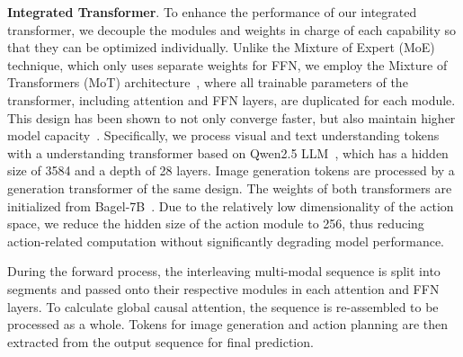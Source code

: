 \textbf{Integrated Transformer}.
To enhance the performance of our integrated transformer, we decouple the modules and weights in charge of each capability so that they can be optimized individually. 
Unlike the Mixture of Expert (MoE) technique, which only uses separate weights for FFN, we employ the Mixture of Transformers (MoT) architecture~\cite{MoT, llamafusion}, where all trainable parameters of the transformer, including attention and FFN layers, are duplicated for each module. 
This design has been shown to not only converge faster, but also maintain higher model capacity~\cite{bagel}. 
Specifically, we process visual and text understanding tokens with a understanding transformer based on Qwen2.5 LLM~\cite{qwen2_5}, which has a hidden size of 3584 and a depth of 28 layers. 
Image generation tokens are processed by a generation transformer of the same design. The weights of both transformers are initialized from Bagel-7B~\cite{bagel}. 
Due to the relatively low dimensionality of the action space, we reduce the hidden size of the action module to 256, thus reducing action-related computation without significantly degrading model performance. 

During the forward process, the interleaving multi-modal sequence is split into segments and passed onto their respective modules in each attention and FFN layers.
To calculate global causal attention, the sequence is re-assembled to be processed as a whole. 
Tokens for image generation and action planning are then extracted from the output sequence for final prediction. 


